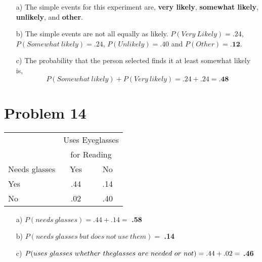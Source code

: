 \documentclass{article}
\begin{document}
\begin{enumerate}
\item[a)] The simple events for this experiment are, \textbf{very likely}, \textbf{somewhat likely}, \textbf{unlikely}, and \textbf{other}.
\item[b)] The simple events are not all equally as likely. $P(Very\ Likely) = .24$, $P(Somewhat\ likely) = .24$, $P(Unlikely) = .40$ and $P(Other) = \textbf{.12}$.
\item[c)] The probability that the person selected finds it at least somewhat likely is, $$P(Somewhat\ likely) + P(Very\ likely) = .24 + .24 = \textbf{.48}$$
\end{enumerate}


\section*{Problem 14}

\begin{multicols}{2}

    \begin{tabular}{l c c}
    \hline
                  & \multicolumn{2}{c}{Uses Eyeglasses} \\ 
                  & \multicolumn{2}{c}{for Reading} \\ \cline{2-3}
    Needs glasses & Yes & No \\
    \hline
    Yes           & .44 & .14 \\
    No            & .02 & .40 \\
    \hline
    \end{tabular}

    \vfill
    \columnbreak

    \begin{enumerate}
        \item[a)] $P(needs\ glasses) = .44 + .14 =$ \textbf{.58}
        \item[b)] $P(needs\ glasses\ but\ does\ not\ use\ them) =$ \textbf{.14}    
        \item[c)] $P(uses\ glasses\ whether\ the\\glasses\ are\ needed\ or\ not) = .44 + .02 =$ \textbf{.46}
    \end{enumerate}
\end{multicols}
\end{document}
